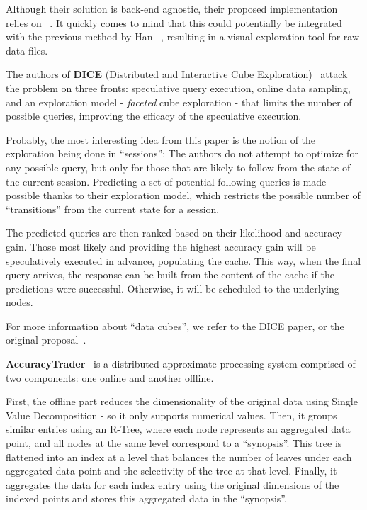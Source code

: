 Although their solution is back-end agnostic, their proposed implementation 
relies on \scidb~\cite{Stonebraker2011}. It quickly comes to mind that this could 
potentially be integrated with the previous method by Han \etal~\cite{Han2017}, 
resulting in a visual exploration tool for raw data files.

\medskip

The authors of \textbf{DICE} (Distributed and Interactive Cube 
Exploration)~\cite{Kamat2014} attack the problem on three fronts: speculative 
query execution, online data sampling, and an exploration model - 
\textit{faceted} cube exploration - that limits the number of possible queries, 
improving the efficacy of the speculative execution.

Probably, the most interesting idea from this paper is the notion of 
the exploration being done in ``sessions'': The authors do not attempt to 
optimize for any possible query, but only for those that are likely to follow 
from the state of the current session. Predicting a set of potential following 
queries is made possible thanks to their exploration model, which
restricts the possible number of ``transitions'' from the current state 
for a session.

The predicted queries are then ranked based on their likelihood and 
accuracy gain. Those most likely and providing the highest accuracy gain 
will be speculatively executed in advance, populating the cache. This way,
when the final  query arrives, the response can be built from the content of
the cache if the  predictions were successful. Otherwise, it will be scheduled
to the underlying nodes.

For more information about ``data cubes'', we refer to the DICE paper,
or the original proposal~\cite{Gray1997}.

\medskip

\textbf{AccuracyTrader}~\cite{Han2016} is a distributed approximate processing 
system comprised of two components: one online and another offline.

First, the offline part reduces the dimensionality of the original data using 
Single Value Decomposition - so it only supports numerical values. 
Then, it groups similar entries using an R-Tree, where each node represents an 
aggregated data point, and all nodes at the same level correspond to a 
``synopsis''. This tree is flattened into an index at a level that balances 
the number of leaves under each aggregated data point and the 
selectivity of the tree at that level. Finally, it aggregates the data for 
each index entry using the original dimensions of the indexed points and stores 
this aggregated data in the ``synopsis''.

